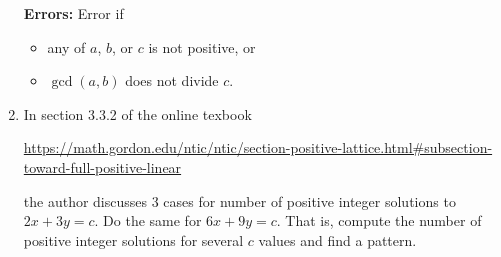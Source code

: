 \documentclass[12pt]{article}
\begin{document}
\begin{enumerate}
{\begin{minipage}{.9\textwidth}
			\textbf{Errors:} Error if 
				\begin{itemize}
					\item any of $a$, $b$, or $c$ is not positive, or
					\item $\gcd(a,b)$ does not divide $c$.
				\end{itemize} 
	\end{minipage}}
\item In section 3.3.2 of the online texbook \begin{center}
	\url{https://math.gordon.edu/ntic/ntic/section-positive-lattice.html#subsection-toward-full-positive-linear}
\end{center} the author discusses 3 cases for number of positive integer solutions to $2x+3y=c$. Do the same for $6x+9y=c$. That is, compute the number of positive integer solutions for several $c$ values and find a pattern.
	
	
\end{enumerate}
		
\end{document}
